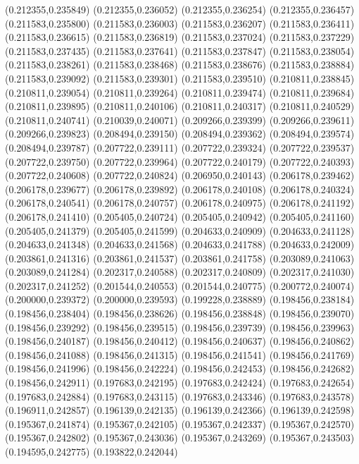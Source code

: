 (0.212355,0.235849)
(0.212355,0.236052)
(0.212355,0.236254)
(0.212355,0.236457)
(0.211583,0.235800)
(0.211583,0.236003)
(0.211583,0.236207)
(0.211583,0.236411)
(0.211583,0.236615)
(0.211583,0.236819)
(0.211583,0.237024)
(0.211583,0.237229)
(0.211583,0.237435)
(0.211583,0.237641)
(0.211583,0.237847)
(0.211583,0.238054)
(0.211583,0.238261)
(0.211583,0.238468)
(0.211583,0.238676)
(0.211583,0.238884)
(0.211583,0.239092)
(0.211583,0.239301)
(0.211583,0.239510)
(0.210811,0.238845)
(0.210811,0.239054)
(0.210811,0.239264)
(0.210811,0.239474)
(0.210811,0.239684)
(0.210811,0.239895)
(0.210811,0.240106)
(0.210811,0.240317)
(0.210811,0.240529)
(0.210811,0.240741)
(0.210039,0.240071)
(0.209266,0.239399)
(0.209266,0.239611)
(0.209266,0.239823)
(0.208494,0.239150)
(0.208494,0.239362)
(0.208494,0.239574)
(0.208494,0.239787)
(0.207722,0.239111)
(0.207722,0.239324)
(0.207722,0.239537)
(0.207722,0.239750)
(0.207722,0.239964)
(0.207722,0.240179)
(0.207722,0.240393)
(0.207722,0.240608)
(0.207722,0.240824)
(0.206950,0.240143)
(0.206178,0.239462)
(0.206178,0.239677)
(0.206178,0.239892)
(0.206178,0.240108)
(0.206178,0.240324)
(0.206178,0.240541)
(0.206178,0.240757)
(0.206178,0.240975)
(0.206178,0.241192)
(0.206178,0.241410)
(0.205405,0.240724)
(0.205405,0.240942)
(0.205405,0.241160)
(0.205405,0.241379)
(0.205405,0.241599)
(0.204633,0.240909)
(0.204633,0.241128)
(0.204633,0.241348)
(0.204633,0.241568)
(0.204633,0.241788)
(0.204633,0.242009)
(0.203861,0.241316)
(0.203861,0.241537)
(0.203861,0.241758)
(0.203089,0.241063)
(0.203089,0.241284)
(0.202317,0.240588)
(0.202317,0.240809)
(0.202317,0.241030)
(0.202317,0.241252)
(0.201544,0.240553)
(0.201544,0.240775)
(0.200772,0.240074)
(0.200000,0.239372)
(0.200000,0.239593)
(0.199228,0.238889)
(0.198456,0.238184)
(0.198456,0.238404)
(0.198456,0.238626)
(0.198456,0.238848)
(0.198456,0.239070)
(0.198456,0.239292)
(0.198456,0.239515)
(0.198456,0.239739)
(0.198456,0.239963)
(0.198456,0.240187)
(0.198456,0.240412)
(0.198456,0.240637)
(0.198456,0.240862)
(0.198456,0.241088)
(0.198456,0.241315)
(0.198456,0.241541)
(0.198456,0.241769)
(0.198456,0.241996)
(0.198456,0.242224)
(0.198456,0.242453)
(0.198456,0.242682)
(0.198456,0.242911)
(0.197683,0.242195)
(0.197683,0.242424)
(0.197683,0.242654)
(0.197683,0.242884)
(0.197683,0.243115)
(0.197683,0.243346)
(0.197683,0.243578)
(0.196911,0.242857)
(0.196139,0.242135)
(0.196139,0.242366)
(0.196139,0.242598)
(0.195367,0.241874)
(0.195367,0.242105)
(0.195367,0.242337)
(0.195367,0.242570)
(0.195367,0.242802)
(0.195367,0.243036)
(0.195367,0.243269)
(0.195367,0.243503)
(0.194595,0.242775)
(0.193822,0.242044)
